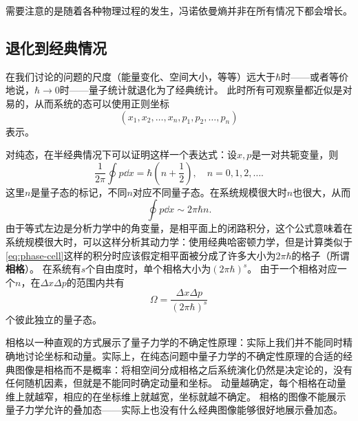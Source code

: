 \documentclass[hyperref, UTF8, a4paper]{ctexart}
\begin{document}
需要注意的是随着各种物理过程的发生，冯诺依曼熵并非在所有情况下都会增长。

\subsection{退化到经典情况}\label{sec:back-to-classical}


在我们讨论的问题的尺度（能量变化、空间大小，等等）远大于$\hbar$时——或者等价地说，$\hbar\to 0$时——量子统计就退化为了经典统计。
此时所有可观察量都近似是对易的，从而系统的态可以使用正则坐标
\[
    (x_1, x_2, \ldots, x_n, p_1, p_2, \ldots, p_n)
\]
表示。

对纯态，在半经典情况下可以证明这样一个表达式：设$x,p$是一对共轭变量，则
\begin{equation}
    \frac{1}{2\pi} \oint p \dd{x} = \hbar \left(n + \frac{1}{2}\right), \quad n = 0, 1, 2, \ldots.
\end{equation}
这里$n$是量子态的标记，不同$n$对应不同量子态。在系统规模很大时$n$也很大，从而
\begin{equation}
    \oint p \dd{x} \sim 2 \pi \hbar n.
    \label{eq:phase-cell}
\end{equation}
由于等式左边是分析力学中的角变量，是相平面上的闭路积分，这个公式意味着在系统规模很大时，可以这样分析其动力学：使用经典哈密顿力学，但是计算类似于\eqref{eq:phase-cell}这样的积分时应该假定相平面被分成了许多大小为$2\pi \hbar$的格子（所谓\textbf{相格}）。
在系统有$s$个自由度时，单个相格大小为$(2\pi \hbar)^s$。
由于一个相格对应一个$n$，在$\Delta x \Delta p$的范围内共有
\begin{equation}
    \Omega = \frac{\Delta x \Delta p}{(2\pi \hbar)^s}
\end{equation}
个彼此独立的量子态。

相格以一种直观的方式展示了量子力学的不确定性原理：实际上我们并不能同时精确地讨论坐标和动量。实际上，在纯态问题中量子力学的不确定性原理的合适的经典图像是相格而不是概率：将相空间分成相格之后系统演化仍然是决定论的，没有任何随机因素，但就是不能同时确定动量和坐标。
动量越确定，每个相格在动量维上就越窄，相应的在坐标维上就越宽，坐标就越不确定。
相格的图像不能展示量子力学允许的叠加态——实际上也没有什么经典图像能够很好地展示叠加态。
\end{document}
